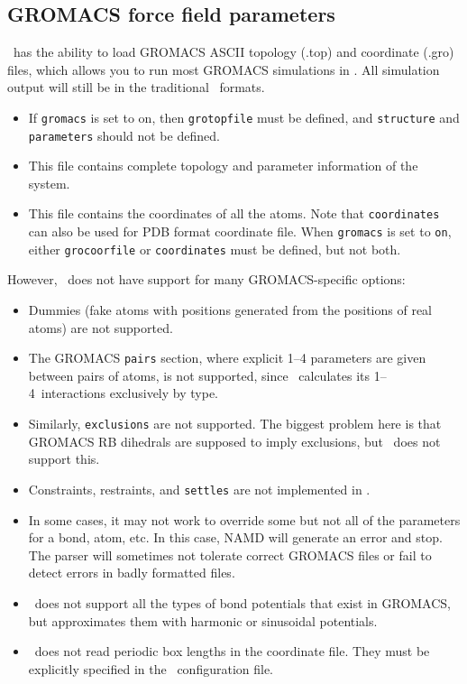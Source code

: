 \subsection{GROMACS force field parameters}

\NAMD\ has the ability to load GROMACS ASCII topology (.top) and
coordinate (.gro) files, which allows you to run most GROMACS
simulations in \NAMD.  All simulation output will still be in the
traditional \NAMD\ formats.

\begin{itemize}
\item
{}
{
If {\tt gromacs} is set to on, then {\tt grotopfile} must be defined,
and {\tt structure} and {\tt parameters} should not be defined.
}
\item
{}
{
This file contains complete topology and parameter information of
the system.
}

\item
{}
{
This file contains the coordinates of all the atoms. Note that
{\tt coordinates} can also be used for PDB format coordinate
file. When {\tt gromacs} is set to {\tt on}, either {\tt grocoorfile}
or {\tt coordinates} must be defined, but not both.
}
\end{itemize}

\noindent However, \NAMD\ does not have support for many GROMACS-specific
options:

\begin{itemize}

\item Dummies (fake atoms with positions generated from the positions
of real atoms) are not supported.
\item The GROMACS \verb^pairs^ section, where explicit 1--4 parameters
are given between pairs of atoms, is not supported, since \NAMD\
calculates its 1--4~interactions exclusively by type.
\item Similarly, \verb^exclusions^ are not supported.  The biggest
problem here is that GROMACS RB dihedrals are supposed to imply
exclusions, but \NAMD\ does not support this.
\item Constraints, restraints, and \verb^settles^ are not
implemented in \NAMD.
\item In some cases, it may not work to override some but not all of
the parameters for a bond, atom, etc.  In this case, NAMD will
generate an error and stop.  The parser will sometimes not tolerate
correct GROMACS files or fail to detect errors in badly formatted
files.
\item \NAMD\ does not support all the types of bond potentials that
exist in GROMACS, but approximates them with harmonic or sinusoidal
potentials.
\item \NAMD\ does not read periodic box lengths in the
coordinate file. They must be explicitly specified in the \NAMD\
configuration file.

\end{itemize}

